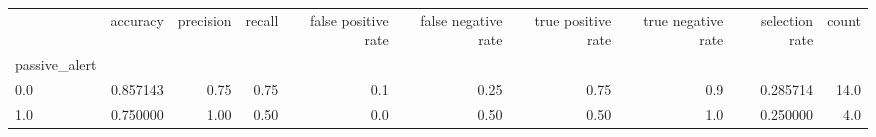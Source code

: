 \begin{tabular}{lrrrrrrrrr}
\toprule
{} &  accuracy &  precision &  recall &  false positive rate &  false negative rate &  true positive rate &  true negative rate &  selection rate &  count \\
passive\_alert &           &            &         &                      &                      &                     &                     &                 &        \\
\midrule
0.0           &  0.857143 &       0.75 &    0.75 &                  0.1 &                 0.25 &                0.75 &                 0.9 &        0.285714 &   14.0 \\
1.0           &  0.750000 &       1.00 &    0.50 &                  0.0 &                 0.50 &                0.50 &                 1.0 &        0.250000 &    4.0 \\
\bottomrule
\end{tabular}
